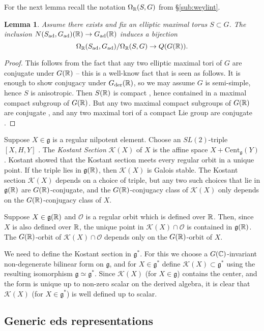\documentclass{article}
\newtheorem{lem}[thm]{Lemma}
\theoremstyle{definition}
\numberwithin{equation}{section}
\renewcommand{\-}{\hyp{}}
\newcommand{\g}{\mathfrak g}
\renewcommand{\O}{\mathcal O}
\newcommand{\K}{\mathcal K}
\newcommand{\Cent}{\mathrm{Cent}}
\begin{document}
For the next lemma recall the notation $\Omega_{\mathbb{R}}(S,G)$ from \S\ref{sub:weylint}.

\begin{lem} \label{lem:g2}
	Assume there exists and fix an elliptic maximal torus $S \subset G$. The inclusion $N(S_{\textrm{ad}},G_{\textrm{ad}})(\mathbb{R}) \to G_{\textrm{ad}}(\mathbb{R})$ induces a bijection 
	\[ \Omega_{\mathbb{R}}(S_{\textrm{ad}},G_{\textrm{ad}})/\Omega_{\mathbb{R}}(S,G) \to Q(G(\mathbb{R})). \]
\end{lem}
\begin{proof}
	This follows from the fact that any two elliptic maximal tori of $G$ are conjugate under $G(\mathbb{R})$ -- this is a well-know fact that is seen as follows. It is enough to show conjugacy under $G_{\textrm{der}}(\mathbb{R})$, so we may assume $G$ is semi-simple, hence $S$ is anisotropic. Then $S(\mathbb{R})$ is compact \cite[\S24.6(c)]{Bor91}, hence contained in a maximal compact subgroup of $G(\mathbb{R})$. But any two maximal compact subgroups of $G(\mathbb{R})$ are conjugate \cite[\S24.6(a)]{Bor91}, and any two maximal tori of a compact Lie group are conjugate \cite[Corollary 4.35]{KnappLie}.
\end{proof}


Suppose $X\in\g$ is a regular nilpotent element. Choose an
$SL(2)$-triple $[X,H,Y]$ \cite[Chapter 3]{CM}.  The {\it Kostant Section} $\K(X)$ of
$X$ is the affine space $X+\Cent_\g(Y)$.
Kostant showed \cite{Kos63} that the Kostant section meets every regular orbit in a unique point. If the triple lies in $\g(\R)$, then $\K(X)$ is Galois stable. The Kostant section $\K(X)$ depends on a choice of
triple, but any two such choices that lie in $\g(\R)$ are $G(\mathbb{R})$-conjugate, and the $G(\mathbb{R})$-conjugacy class of $\K(X)$ only depends on the $G(\mathbb{R})$-conjugacy class of $X$.

Suppose $X\in \g(\R)$ and $\O$ is a regular orbit which is defined over $\mathbb{R}$.
Then, since $X$ is also defined over $\mathbb{R}$, the unique point in $\K(X)\cap \O$ is contained in $\g(\R)$. The $G(\mathbb{R})$-orbit of $\K(X)\cap \O$ depends only on the $G(\mathbb{R})$-orbit of $X$.

We need to define the Kostant section in $\g^*$. For this we choose a $G(\mathbb{C})$-invariant non-degenerate bilinear form on $\g$, and
for $X\in \g^*$ define $\K(X)\subset \g^*$ using the  resulting isomorphism $\g\simeq\g^*$. 
Since $\K(X)$ (for $X\in \g$) contains the center, and the form is unique up to non-zero scalar on the derived algebra,
it is clear that $\K(X)$ (for $X\in \g^*$) is well defined up to scalar.  


\subsection{Generic eds representations} \label{sub:gen}
\end{document}
